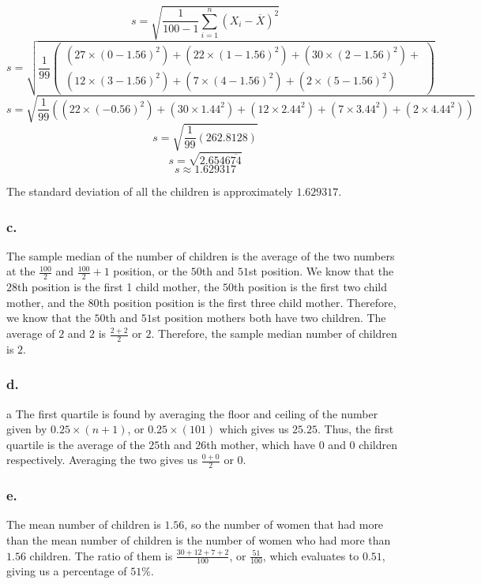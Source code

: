 \documentclass[11pt]{article}
\begin{document}
\[s = \sqrt{\frac{1}{100-1}\sum\limits_{i=1}^{n}{(X_i-\overline X)}^2}\]
\[s = \sqrt{
    \frac{1}{99}
    \left(\begin{array}{c}\left( 27 \times {(0-1.56)}^2 \right) + 
        \left(22 \times {(1-1.56)}^2 \right) + \left( 30 \times {(2-1.56)}^2 \right) +\\
        \left( 12 \times {(3-1.56)}^2 \right) + \left( 7 \times {(4-1.56)}^2 \right) + 
        \left( 2 \times {(5-1.56)}^2 \right)
    \end{array}\right)
    }
\]
\[s = \sqrt{\frac{1}{99}\left(\left(22 \times
    {(-0.56)}^2\right) + \left(30 \times 1.44^2\right) + \left(12 \times 2.44^2\right)
    + \left( 7 \times 3.44^2\right) + \left(2 \times 4.44^2\right)\right) }\]
\[s = \sqrt{\frac{1}{99}\left(262.8128\right)}\]
\[s = \sqrt{2.6546\overline{74}}\]
\[s \approx 1.629317\] 

The standard deviation of all the children is approximately $1.629317$. 

\subsubsection*{c.}
The sample median of the number of children is the average of the two numbers at
the $\frac{100}{2}$ and $\frac{100}{2} + 1$ position, or the $50$th and $51$st
position. We know that the $28$th position is the first 1 child mother, the $50$th
position is the first two child mother, and the $80$th position position is the
first three child mother. Therefore, we know that the $50$th and $51$st position
mothers both have two children. The average of $2$ and $2$ is $\frac{2+2}{2}$ or
$2$. Therefore, the sample median number of children is $2$.

\subsubsection*{d.}a
The first quartile is found by averaging the floor and ceiling of the number
given by $0.25 \times (n + 1)$, or $0.25 \times (101)$ which gives us $25.25$.
Thus, the first quartile is the average of the $25$th and $26$th mother, which
have $0$ and $0$ children respectively. Averaging the two gives us
$\frac{0+0}{2}$ or $0$. 

\subsubsection*{e.}
The mean number of children is $1.56$, so the number of women that had more
than the mean number of children is the number of women who had more than $1.56$
children. The ratio of them is $\frac{30+12+7+2}{100}$, or
$\frac{51}{100}$, which evaluates to $0.51$, giving us a percentage of $51\%$.
\end{document}
